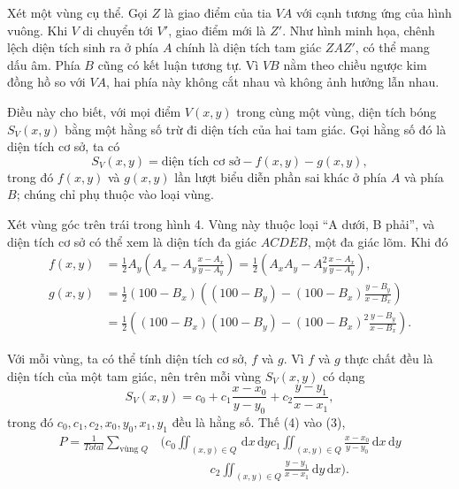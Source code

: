 \documentclass[11pt]{article}
\newcommand{\dd}{\,\mathrm{d}}
\newcommand{\Total}{\mathit{Total}}
\begin{document}
Xét một vùng cụ thể. Gọi \(Z\) là giao điểm của tia \(VA\) với cạnh tương ứng
của hình vuông. Khi \(V\) di chuyển tới \(V'\), giao điểm mới là \(Z'\). Như
hình minh họa, chênh lệch diện tích sinh ra ở phía \(A\) chính là diện tích
tam giác \(ZAZ'\), có thể mang dấu âm. Phía \(B\) cũng có kết luận tương tự.
Vì \(VB\) nằm theo chiều ngược kim đồng hồ so với \(VA\), hai phía này không
cắt nhau và không ảnh hưởng lẫn nhau.

Điều này cho biết, với mọi điểm \(V(x,y)\) trong cùng một vùng, diện tích bóng
\(S_V(x,y)\) bằng một hằng số trừ đi diện tích của hai tam giác. Gọi hằng số
đó là diện tích cơ sở, ta có
\[
  S_V(x,y)=\text{diện tích cơ sở}-f(x,y)-g(x,y),
\]
trong đó \(f(x,y)\) và \(g(x,y)\) lần lượt biểu diễn phần sai khác ở phía
\(A\) và phía \(B\); chúng chỉ phụ thuộc vào loại vùng.

Xét vùng góc trên trái trong hình 4. Vùng này thuộc loại ``A dưới, B phải'',
và diện tích cơ sở có thể xem là diện tích đa giác \(ACDEB\), một đa giác lõm.
Khi đó
\[
\begin{aligned}
f(x,y)
&=\frac12 A_y\left(A_x-A_y\frac{x-A_x}{y-A_y}\right)
 =\frac12\left(A_xA_y-A_y^2\frac{x-A_x}{y-A_y}\right),\\
g(x,y)
&=\frac12(100-B_x)
  \left((100-B_y)-(100-B_x)\frac{y-B_y}{x-B_x}\right)\\
&=\frac12\left((100-B_x)(100-B_y)
-(100-B_x)^2\frac{y-B_y}{x-B_x}\right).
\end{aligned}
\]

Với mỗi vùng, ta có thể tính diện tích cơ sở, \(f\) và \(g\). Vì \(f\) và
\(g\) thực chất đều là diện tích của một tam giác, nên trên mỗi vùng
\(S_V(x,y)\) có dạng
\[
  S_V(x,y)
  =
  c_0+c_1\frac{x-x_0}{y-y_0}
     +c_2\frac{y-y_1}{x-x_1},
  \tag{4}
\]
trong đó \(c_0,c_1,c_2,x_0,y_0,x_1,y_1\) đều là hằng số. Thế (4) vào (3),
\[
\begin{aligned}
P=\frac1{\Total}
\sum_{\text{vùng }Q}
&\Biggl(
c_0\iint_{(x,y)\in Q}\dd x\dd y
c_1\iint_{(x,y)\in Q}\frac{x-x_0}{y-y_0}\dd x\dd y\\
&\qquad\qquad
c_2\iint_{(x,y)\in Q}\frac{y-y_1}{x-x_1}\dd y\dd x
\Biggr).
\end{aligned}
\tag{5}
\]
\end{document}
